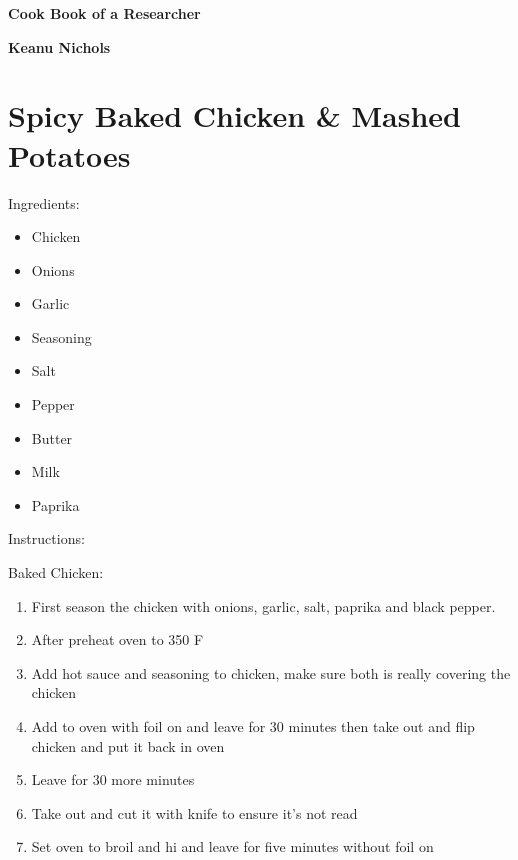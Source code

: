 \documentclass{article}
\begin{document}
\begin{titlepage}
    \begin{center}
        \vspace{1cm}

        \Large
        \flushleft\textbf{Cook Book of a Researcher}

        \vspace{1cm}
        \textbf{Keanu Nichols}
        \vspace{1cm}
        \newline
        \vfill
        \vspace{1.5cm}
    \end{center}
\end{titlepage}
\renewcommand\thesection{\Alph{section}}
\tableofcontents
\newpage


\section{Spicy Baked Chicken \& Mashed Potatoes}

Ingredients:

\begin{itemize}
    \item Chicken
    \item Onions
    \item Garlic
    \item Seasoning
    \item Salt
    \item Pepper
    \item Butter
    \item Milk
    \item Paprika
\end{itemize}

Instructions:

Baked Chicken:

\begin{enumerate}
    \item First season the chicken with onions, garlic, salt, paprika and black pepper.
    \item After preheat oven to 350 F
    \item Add hot sauce and seasoning to chicken, make sure both is really covering the chicken
    \item Add to oven with foil on and leave for 30 minutes then take out and flip chicken and put it back in oven
    \item Leave for 30 more minutes
    \item Take out and cut it with knife to ensure it's not read
    \item Set oven to broil and hi and leave for five minutes without foil on
\end{enumerate}
\end{document}
